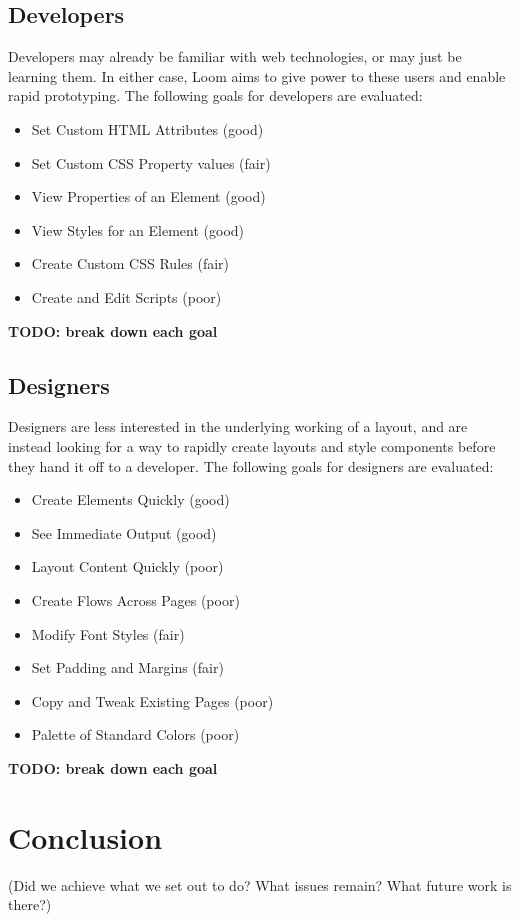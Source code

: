 \documentclass[conference, letterpaper]{IEEEtran}
\begin{document}
\subsection{Developers}
Developers may already be familiar with web technologies, or may just be learning them. In either case, Loom aims to give power to these users and enable rapid prototyping. The following goals for developers are evaluated:
\begin{itemize}
  \item Set Custom HTML Attributes (good)
  \item Set Custom CSS Property values (fair)
  \item View Properties of an Element (good)
  \item View Styles for an Element (good)
  \item Create Custom CSS Rules (fair)
  \item Create and Edit Scripts (poor)
\end{itemize}
\textbf{TODO: break down each goal}

\subsection{Designers}
Designers are less interested in the underlying working of a layout, and are instead looking for a way to rapidly create layouts and style components before they hand it off to a developer. The following goals for designers are evaluated:
\begin{itemize}
  \item Create Elements Quickly (good)
  \item See Immediate Output (good)
  \item Layout Content Quickly (poor)
  \item Create Flows Across Pages (poor)
  \item Modify Font Styles (fair)
  \item Set Padding and Margins (fair)
  \item Copy and Tweak Existing Pages (poor)
  \item Palette of Standard Colors (poor)
\end{itemize}
\textbf{TODO: break down each goal}

\section{Conclusion}
(Did we achieve what we set out to do? What issues remain? What future work is there?)
\end{document}
